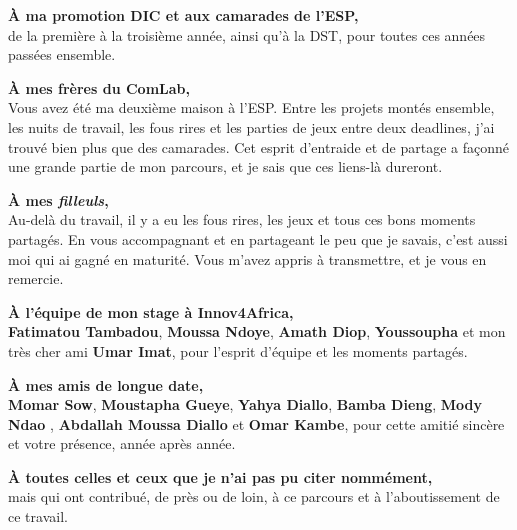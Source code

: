 \noindent\textbf{À ma promotion DIC et aux camarades de l'ESP,}\\
de la première à la troisième année, ainsi qu'à la DST, pour toutes ces années
passées ensemble.

\vspace{0.16cm}

\noindent\textbf{À mes frères du ComLab,}\\
Vous avez été ma deuxième maison à l'ESP. Entre les projets montés ensemble,
les nuits de travail, les fous rires et les parties de jeux entre deux
deadlines, j'ai trouvé bien plus que des camarades. Cet esprit d'entraide et
de partage a façonné une grande partie de mon parcours, et je sais que ces
liens-là dureront.

\vspace{0.16cm}

\noindent\textbf{À mes \textit{filleuls},}\\
Au-delà du travail, il y a eu les fous rires, les jeux et tous ces bons moments
partagés. En vous accompagnant et en partageant le peu que je savais, c'est
aussi moi qui ai gagné en maturité. Vous m'avez appris à transmettre, et je
vous en remercie.

\vspace{0.16cm}

\noindent\textbf{À l'équipe de mon stage à Innov4Africa,}\\
\textbf{Fatimatou Tambadou}, \textbf{Moussa Ndoye}, \textbf{Amath Diop},
\textbf{Youssoupha} et mon très cher ami \textbf{Umar Imat}, pour l'esprit
d'équipe et les moments partagés.

\vspace{0.16cm}

\noindent\textbf{À mes amis de longue date,}\\
\textbf{Momar Sow}, \textbf{Moustapha Gueye}, \textbf{Yahya Diallo},
\textbf{Bamba Dieng}, \textbf{Mody Ndao} , \textbf{Abdallah Moussa Diallo} et \textbf{Omar Kambe}, pour cette amitié
sincère et votre présence, année après année.

\vspace{0.16cm}

\noindent\textbf{À toutes celles et ceux que je n'ai pas pu citer nommément,}\\
mais qui ont contribué, de près ou de loin, à ce parcours et à l'aboutissement
de ce travail.

\cleardoublepage

